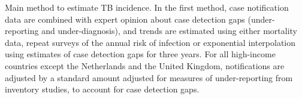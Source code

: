 \label{fig:incmethods}Main method to estimate TB incidence. In the first method, case notification data are combined with expert opinion about case detection gaps (under-reporting and under-diagnosis), and trends are estimated using either mortality data, repeat surveys of the annual risk of infection or exponential interpolation using estimates of case detection gaps for three years. For all high-income countries except the Netherlands and the United Kingdom, notifications are adjusted by a standard amount adjusted for measures of under-reporting from inventory studies, to account for case detection gaps. 